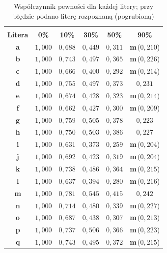 \documentclass[12pt]{article}
\begin{document}
\begin{table}[h!]
 \caption{Współczynnik pewności dla każdej litery; przy błędzie podano literę rozpoznaną (pogrubioną)}
 \centering
 \small
 \vspace{0.2cm}
 \begin{tabular}{c c c c c c}
  \hline\hline\\[-0.4cm]
  \textbf{Litera} & \textbf{0\%} & \textbf{10\%} & \textbf{30\%} & \textbf{50\%} & \textbf{90\%}\\[0.1cm]
  \hline
  \textbf{a} & $1{,}000$ & $0{,}688$ & $0{,}449$ & $0{,}311$ & \textbf{m}\,($0{,}210$) \\
  \textbf{b} & $1{,}000$ & $0{,}743$ & $0{,}497$ & $0{,}365$ & \textbf{m}\,($0{,}226$) \\
  \textbf{c} & $1{,}000$ & $0{,}666$ & $0{,}400$ & $0{,}292$ & \textbf{m}\,($0{,}214$) \\
  \textbf{d} & $1{,}000$ & $0{,}755$ & $0{,}497$ & $0{,}373$ & $0{,}231$ \\
  \textbf{e} & $1{,}000$ & $0{,}674$ & $0{,}428$ & $0{,}323$ & \textbf{m}\,($0{,}214$) \\
  \textbf{f} & $1{,}000$ & $0{,}662$ & $0{,}427$ & $0{,}300$ & \textbf{m}\,($0{,}209$) \\
  \textbf{g} & $1{,}000$ & $0{,}759$ & $0{,}505$ & $0{,}378$ & $0{,}223$ \\
  \textbf{h} & $1{,}000$ & $0{,}750$ & $0{,}503$ & $0{,}386$ & $0{,}227$ \\
  \textbf{i} & $1{,}000$ & $0{,}631$ & $0{,}373$ & $0{,}259$ & \textbf{m}\,($0{,}204$) \\
  \textbf{j} & $1{,}000$ & $0{,}692$ & $0{,}423$ & $0{,}319$ & \textbf{m}\,($0{,}204$) \\
  \textbf{k} & $1{,}000$ & $0{,}738$ & $0{,}486$ & $0{,}364$ & \textbf{m}\,($0{,}215$) \\
  \textbf{l} & $1{,}000$ & $0{,}637$ & $0{,}394$ & $0{,}280$ & \textbf{m}\,($0{,}216$) \\
  \textbf{m} & $1{,}000$ & $0{,}781$ & $0{,}545$ & $0{,}415$ & $0{,}242$ \\
  \textbf{n} & $1{,}000$ & $0{,}714$ & $0{,}480$ & $0{,}339$ & \textbf{m}\,($0{,}227$) \\
  \textbf{o} & $1{,}000$ & $0{,}687$ & $0{,}438$ & $0{,}307$ & \textbf{m}\,($0{,}213$) \\
  \textbf{p} & $1{,}000$ & $0{,}737$ & $0{,}506$ & $0{,}366$ & \textbf{m}\,($0{,}223$) \\
  \textbf{q} & $1{,}000$ & $0{,}743$ & $0{,}495$ & $0{,}372$ & \textbf{m}\,($0{,}215$) \\

\end{tabular}
\end{table}
\end{document}
